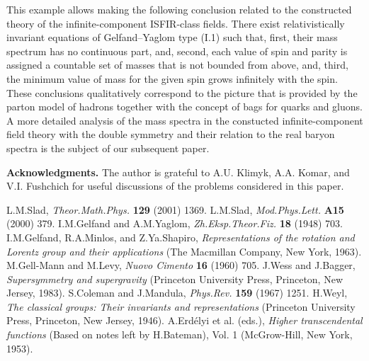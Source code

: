 \documentclass[a4paper,12pt]{article}
\begin{document}
This example allows making the following conclusion related to the constructed
theory of the infinite-component ISFIR-class fields. There exist
relativistically invariant equations of Gelfand--Yaglom type (I.1) such that,
first, their mass spectrum has no continuous part, and, second, each value of
spin and parity is assigned a countable set of masses that is not bounded from
above, and, third, the minimum value of mass for the given spin grows 
infinitely with the spin. These conclusions qualitatively correspond to the 
picture that is provided by the parton model of hadrons together with the
concept of bags for quarks and gluons. A more detailed analysis of the mass
spectra in the constucted infinite-component field theory with the double
symmetry and their relation to the real baryon spectra is the subject of our
subsequent paper.

{\bf Acknowledgments.} The author is grateful to A.U. Klimyk, A.A. Komar, and
V.I. Fushchich for useful discussions of the problems considered in this paper.

\begin{thebibliography}{99}

   L.M.Slad, {\it Theor.Math.Phys.} {\bf 129} (2001) 1369. 
   L.M.Slad, {\it Mod.Phys.Lett.} {\bf A15} (2000) 379.
   I.M.Gelfand and A.M.Yaglom, {\it Zh.Eksp.Theor.Fiz.} {\bf 18} (1948) 703. 
   I.M.Gelfand, R.A.Minlos, and Z.Ya.Shapiro, {\it Representations of the
   rotation and Lorentz group and their applications} (The Macmillan Company, 
   New York, 1963).
   M.Gell-Mann and M.Levy, {\it Nuovo Cimento} {\bf 16} (1960) 705.
   J.Wess and J.Bagger, {\it Supersymmetry and supergravity} (Princeton
   University Press, Princeton, New Jersey, 1983).
   S.Coleman and J.Mandula, {\it Phys.Rev.} {\bf 159} (1967) 1251.
   H.Weyl, {\it The classical groups: Their invariants and representations} 
   (Princeton University Press, Princeton, New Jersey, 1946).
   A.Erd\'elyi et al. (eds.), {\it Higher transcendental functions} (Based on
   notes left by H.Bateman), Vol. 1 (McGrow-Hill, New York, 1953).
   
\end{thebibliography}
\end{document}
